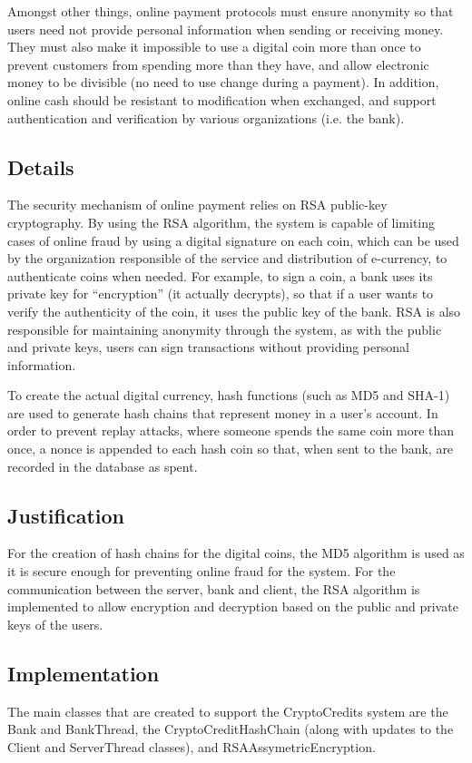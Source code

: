\documentclass[a4paper,11pt]{article}
\begin{document}
Amongst other things, online payment protocols must ensure anonymity so that 
users need not provide personal information when sending or receiving money. 
They must also make it impossible to use a digital coin more than once to 
prevent customers from spending more than they have, and allow electronic money 
to be divisible (no need to use change during a payment). In addition, online 
cash should be resistant to modification when exchanged, and support 
authentication and verification by various organizations (i.e. the bank).

\subsection{Details}
The security mechanism of online payment relies on RSA public-key cryptography. 
By using the RSA algorithm, the system is capable of limiting cases of online 
fraud by using a digital signature on each coin, which can be used by the 
organization responsible of the service and distribution of e-currency, to 
authenticate coins when needed. For example, to sign a coin, a bank uses its 
private key for ``encryption'' (it actually decrypts), so that if a user wants to 
verify the authenticity of the coin, it uses the public key of the bank. RSA is 
also responsible for maintaining anonymity through the system, as with the 
public and private keys, users can sign transactions without providing personal 
information.

To create the actual digital currency, hash functions (such as MD5 and SHA-1) 
are used to generate hash chains that represent money in a user's account. In 
order to prevent replay attacks, where someone spends the same coin more than 
once, a nonce is appended to each hash coin so that, when sent to the bank, are 
recorded in the database as spent.

\subsection{Justification}
For the creation of hash chains for the digital coins, the MD5 algorithm is used
as it is secure enough for preventing online fraud for the system. For the 
communication between the server, bank and client, the RSA algorithm is 
implemented to allow encryption and decryption based on the public and private 
keys of the users.

\subsection{Implementation}
The main classes that are created to support the CryptoCredits system are the 
Bank and BankThread, the CryptoCreditHashChain (along with updates to the Client
and ServerThread classes), and RSAAssymetricEncryption.
\end{document}
